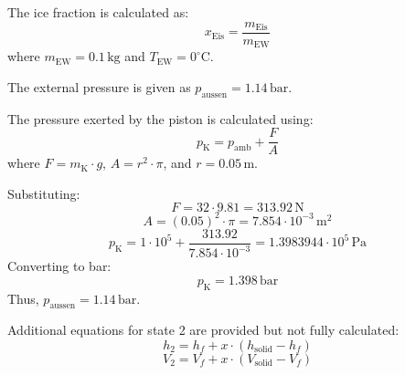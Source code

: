 The ice fraction is calculated as:  
\[
x_{\text{Eis}} = \frac{m_{\text{Eis}}}{m_{\text{EW}}}
\]  
where \( m_{\text{EW}} = 0.1 \, \text{kg} \) and \( T_{\text{EW}} = 0^\circ\text{C} \).  

The external pressure is given as \( p_{\text{aussen}} = 1.14 \, \text{bar} \).  

The pressure exerted by the piston is calculated using:  
\[
p_{\text{K}} = p_{\text{amb}} + \frac{F}{A}
\]  
where \( F = m_{\text{K}} \cdot g \), \( A = r^2 \cdot \pi \), and \( r = 0.05 \, \text{m} \).  

Substituting:  
\[
F = 32 \cdot 9.81 = 313.92 \, \text{N}
\]  
\[
A = (0.05)^2 \cdot \pi = 7.854 \cdot 10^{-3} \, \text{m}^2
\]  
\[
p_{\text{K}} = 1 \cdot 10^5 + \frac{313.92}{7.854 \cdot 10^{-3}} = 1.3983944 \cdot 10^5 \, \text{Pa}
\]  
Converting to bar:  
\[
p_{\text{K}} = 1.398 \, \text{bar}
\]  
Thus, \( p_{\text{aussen}} = 1.14 \, \text{bar} \).  

Additional equations for state 2 are provided but not fully calculated:  
\[
h_2 = h_f + x \cdot (h_{\text{solid}} - h_f)
\]  
\[
V_2 = V_f + x \cdot (V_{\text{solid}} - V_f)
\]